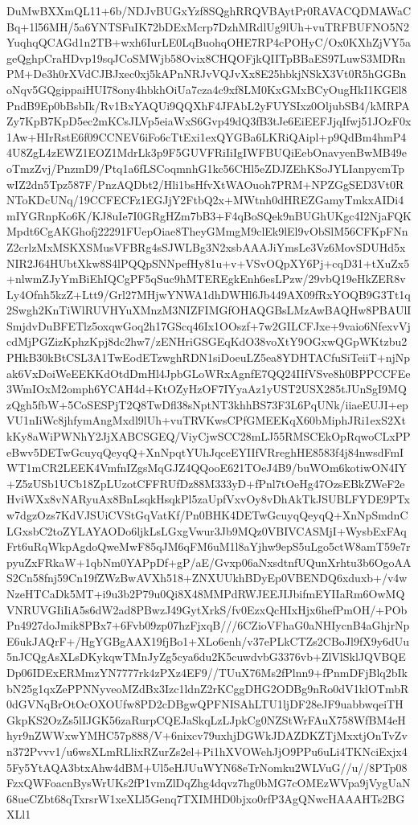 {{{{DuMwBXXmQL11+6b/NDJvBUGxYzf8SQghRRQVBAytPr0RAVACQDMAWaCBq\nANOGphX+1l56MH/5a6YNTSFuIK72bDExMcrp7DzhMRdlUg9lUh+vuTRFBUFNO5N2YuqhqQCAGd1n\nYPaY2TB+wxh6IurLE0LqBuohqOHE7RP4cPOHyC/Ox0KXhZjVY5ageQghpCraHDvp19sqJCoSMWjb\nIOQX58Ovix8CHQOFjkQIITpBBaES97LuwS3MDRnPM+De3h0rXVdCJBJxec0xj5kAPnNRJvVQJvXx\nmktTVBAqkPk8E25hbkjNSkX3Vt0R5hGGBnoNqv5GQgippaiHUI78ony4hbkhOiUa7cza4c9xf8LM\n0KxGMxBCyOugHkI1KGEl8PndB9Ep0bBsbIk/Rv1BxYAQUi9QQXhF4JFAbL2yFUYSIxz0OljubSB4\nHC/kMRPAZy7KpB7KpD5ec2mKCsJLVp5eiaWxS6Gvp49dQ3fB3tJe6EiEEFJjqIfwj51JOzF0x1Aw\nMIR+HIrRstE6f09CCNEV6iFo6cTtExi1exQYGBa6LKRiQAipl+p9QdBm4hmP44U8ZgL4zEWZ1EOZ\n1MdrLk3p9F5GUVFRiIiIgIWFBUQiEebOnavyenBwMB49eoTmzZvj/PnzmD9/Ptq1a6fLSCoqmnhG\nCCH1kc56CHl5eZDJZEhKSoJYLIanpycmTpwIZ2dn5Tpz587F/PnzAQDbt2/Hli1bsHfvXtWAOuoh\nZD7PRM+NPZGgSED3Vt0RNToKDcUNq/19CCFECFz1EGJjY2FtbQ2x+MWtnh0dHREZGamyTmkxAIDi\n4mIYGRnpKo6K/KJ8uIe7I0GRgHZm7bB3+F4qBoSQek9nBUGhUKgc4I2NjaFQKMpdt6CgAKGhofj2\n2291FUepOiae8TheyGMmgM9clEk9lEl9vObSlM56CFKpFNnZ2crlzMxMSKXSMusVFBRg4sSJWLBg\nAWxtbcvdlre3N2xsbAAAJiYmsLe3Vz6MovSDUHd5xNIR2J64HUbtXkw8S4lPQQpSNNpefHy81u+v\nq+VSvOQpXY6Pj+cqD31+tXuZx5+nlwmZJyYmBiEhIQCgPF5qSuc9hMTEREgkEnh6esLPzw/29vbQ\n19eHkZER8vLy4Ofnh5kzZ+Ltt9/Grl27MHjwYNWA1dhDWHl6Jb449AX09fRxYOQB9G3Tt1q2Swgh\nvNHm2KnTiWlRUVHYuXMnzM3NIZFIMGfOHAQGBsLMzAwBAQHw8PBAUlISmjdvDuBFETlz5oxqwGoq\nCDTxjBBSn2h17GScq46Ix1OOszf+7w2GILCFJxe+9vaio6NfexvVjcdMjPGZizKphzKpj8dc2hw7/zENHriGSGEqKdO38voXtY9OGxwQGpWKtzbu2PHkB30kBtCSL3A1TwEodETzwghRDN1siDoeuLZ\nq5ea8YDHTACfuSiTeiiT+njNpak6VxDoiWeEEKKdOtdDmHl4JpbGLoWRxAgnfE7QQ24IIfVSve8h\n0BPPCCFEe3WmIOxM2omph6YCAH4d+KtOZyHzOF7IYyaAz1yUST2USX285tJUnSgI9MQzQgh5fbW+\nh5CoSESPjT2Q8TwDfl38sNptNT3khhBS73F3L6PqUNk/iiaeEUJI+epVU1nIiWc8jhfymAngMxdl\nUg9lUh+vuTRVKwsCPfGMEEKqX60bMiphJRi1exS2XtkKy8aWiPWNhY2JjXABCSGEQ/ViyCjwSCC2\nXtkKI8mLJ55RMSCEkOpRqwoCLxPPeBwv5DETwGcuyqQeyqQ+XnNpqtYUhJqceEYIIfVRreghHE85\njg83f4j84nwsdFmIWT1mCR2LEEK4VmfnIZgsMqGJZ4QQooE621TOeJ4B9/buWOm6kotiwON4IY+Z\nAD5zUSb1UCb18ZpLUzotCFFRUfDz88M333yD+fPnl7tOeHg47OzsEBkZWeF2eHviWXx8vNARyuAx\nE8BnLsqkHsqkPl5zaUpfVxvOy8vDhAkTkJSUBLFYDE9PTxw7dgzOzs7KdVJSUiCVStGqVatKf/Pn\nbeJZRkaG0BHK4DETwGcuyqQeyqQ+XnNpSmdnCLGxsbC2toZYLAYAODo6ljkLsLGxgVwur3Jb9MQz\nQgjRPZ0VBIVCASMjI+WysbExFAqFrt6uRqWkpAgdoQweMwF85qJM6qFM6uM1l8aYjhw9epS5uLgo\nl5ctW8amT59e7rpyuZxFRkaW+1qbNm0YAPpDf+gP/aE/Gvxp06aNxsdtnfUQunXrhtu3b6OgoAAS\niQSnTp2Cn58fnj59Cn19fZWzBwAVXh518+ZNXUUkhBDyEp0VBENDQ6xduxb+/v4wNzeHTCaDk5MT+i9u3b2P79u0Qi8X48MMPdRWJEEJIJbifmEYIIaRm6OwMQVNRUVGIiIiA\nhYUFRCIR5s6dW2ad8PBwzJ49GytXrkS/fv0EzxQcHIxHjx6hefPmOH/+PObPn4927doJmik8PBx7+6Fvb09zp07hzFjxqB///6CZioVFhaG0aNHIycnB4aGhjrNpE6ukJAQrF+/HgYGBgAAX19fjBo1+XLo6enh/v37ePLkCTZs2CBoJl9fX9y6dUu5nJCQgAsXLsDKykqwTMnJyZg5cya6du2K\nS5cuwdvbG3376vb+ZlVlSklJQVBQEDp06IDExERMmzYN7777rk4zPXz4EF9//TUuX76Ms2fPlnn9\n+fPnmDFjBlq2bIkbN25g1qxZePPNNyveoMZdBx3Izc1ldnZ2rKCggDHG2ODBg9nRo0dV1klOTmbR\n0dGVNqBrOtOcOXOUfw8PD2cDBgwQPFNISAhLTU1ljDF28eJF9uabbwqeiTHGkpKS2OzZs5lIJGK5\nubk6zaRurpCQEJaSkqLzLJpkCg0NZStWrFAuX758WfBM4eHhyr9nZWWxwYMHC57p888/V+6nixcv\nsrfeekvwTIMGDWJ79uxhjDGWkJDAZDKZTjMxxtjOnTvZvn372Pvvv1/u6wsXLmRLlixRZurZs2el+Pi1hXVOWehJjO9PPu6uLi4TKNciExjx45Fy5YtAQA3btxAhw4dBM+Ul5eHJUuWYN68eTrNomku\nAFizZg2WLVuG//u//8PTp08FzxQWFoacnBysWrUKs2fP1vmZlDqZhg4dqvz7hg0bMG7cOMEzWVpa\nKi9jVygUaN68ueCZbt68qTxrsrW1xeXLl5Genq7TXIMHD0bjxo0rfP3AgQNwcHAAAHTs2BGXLl1}}}}
